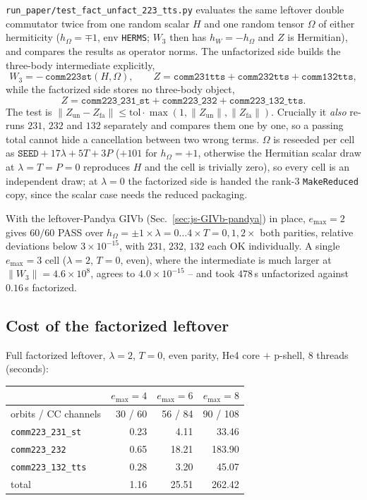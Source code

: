 \documentclass[enabledeprecatedfontcommands]{scrartcl}
\newcommand{\codename}[1]{\texttt{#1}}
\begin{document}
\codename{run\_paper/test\_fact\_unfact\_223\_tts.py} evaluates the same
leftover double commutator twice from one random scalar $H$ and one
random tensor $\Omega$ of either hermiticity ($h_\Omega=\mp1$, env
\texttt{HERMS}; $W_3$ then has $h_W=-h_\Omega$ and $Z$ is Hermitian), and
compares the results as
operator norms. The unfactorized side builds the three-body
intermediate explicitly,
\[
  W_3=-\,\codename{comm223st}(H,\Omega),\qquad
  Z=\codename{comm231tts}+\codename{comm232tts}+\codename{comm132tts},
\]
while the factorized side stores no three-body object,
\[
  Z=\codename{comm223\_231\_st}+\codename{comm223\_232}
   +\codename{comm223\_132\_tts}.
\]
The test is $\lVert Z_{\mathrm{un}}-Z_{\mathrm{fa}}\rVert\le
\mathrm{tol}\cdot\max(1,\lVert Z_{\mathrm{un}}\rVert,
\lVert Z_{\mathrm{fa}}\rVert)$. Crucially it \emph{also} re-runs $231$,
$232$ and $132$ separately and compares them one by one, so a passing
total cannot hide a cancellation between two wrong terms. $\Omega$ is
reseeded per cell as $\mathtt{SEED}+17\lambda+5T+3P$ ($+101$ for
$h_\Omega=+1$, otherwise the Hermitian scalar draw at $\lambda=T=P=0$
reproduces $H$ and the cell is trivially zero), so every cell is an
independent draw; at $\lambda=0$ the factorized side is handed the
rank-3 \codename{MakeReduced} copy, since the scalar case needs the
reduced packaging.

With the leftover-Pandya GIVb (Sec.~\ref{sec:js-GIVb-pandya}) in place,
$e_{\max}=2$ gives $60/60$ PASS over
$h_\Omega=\pm1\times\lambda=0\ldots4\times T=0,1,2\times$ both
parities, relative deviations below $3\times10^{-15}$, with $231$, $232$,
$132$ each OK individually. A single $e_{\max}=3$ cell
($\lambda=2$, $T=0$, even), where the intermediate is much larger at
$\lVert W_3\rVert=4.6\times10^{8}$, agrees to $4.0\times10^{-15}$ --
and took $478$\,s unfactorized against $0.16$\,s factorized.

\subsection{Cost of the factorized leftover}

Full factorized leftover, $\lambda=2$, $T=0$, even parity,
He4 core $+$ p-shell, 8 threads (seconds):

\begin{center}
\begin{tabular}{@{}lrrr@{}}
\hline
 & $e_{\max}=4$ & $e_{\max}=6$ & $e_{\max}=8$ \\
\hline
orbits / CC channels & 30 / 60 & 56 / 84 & 90 / 108 \\
\codename{comm223\_231\_st}   &  0.23 &  4.11 &  33.46 \\
\codename{comm223\_232}       &  0.65 & 18.21 & 183.90 \\
\codename{comm223\_132\_tts}  &  0.28 &  3.20 &  45.07 \\
\hline
total                         &  1.16 & 25.51 & 262.42 \\
\hline
\end{tabular}
\end{center}
\end{document}
